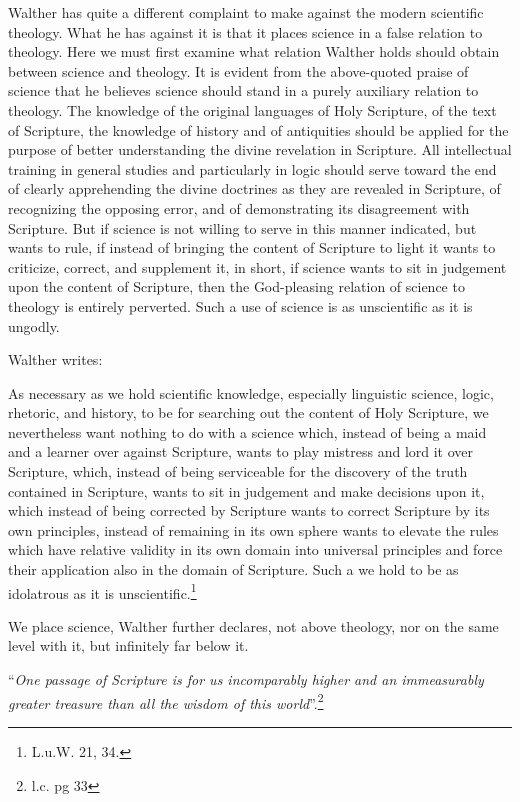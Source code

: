                Walther has quite a different complaint to make against the modern scientific theology.  What he has against it is that it places science in a false relation to theology.  Here we must first examine what relation Walther holds should obtain between science and theology.  It is evident from the above-quoted praise of science that he believes science should stand in a purely auxiliary relation to theology.  The knowledge of the original languages of Holy Scripture, of the text of Scripture, the knowledge of history and of antiquities should be applied for the purpose of better understanding the divine revelation in Scripture.  All intellectual training in general studies and particularly in logic should serve toward the end of clearly apprehending the divine doctrines as they are revealed in Scripture, of recognizing the opposing error, and of demonstrating its disagreement with Scripture.  But if science is not willing to serve in this manner indicated, but wants to rule, if instead of bringing the content of Scripture to light it wants to criticize, correct, and supplement it, in short, if science wants to sit in judgement upon the content of Scripture, then the God-pleasing relation of science to theology is entirely perverted.  Such a use of science is as unscientific as it is ungodly. \par Walther writes: \\\begin{fancyquotes} As necessary as we hold scientific knowledge, especially linguistic science, logic, rhetoric, and history, to be for searching out the content of Holy Scripture, we nevertheless want nothing to do with a science which, instead of being a maid and a learner over against Scripture, wants to play mistress and lord it over Scripture, which, instead of being serviceable for the discovery of the truth contained in Scripture, wants to sit in judgement and make decisions upon it, which instead of being corrected by Scripture wants to correct Scripture by its own principles, instead of remaining in its own sphere wants to elevate the rules which have relative validity in its own domain into universal principles and force their application also in the domain of Scripture.  Such a we hold to be as idolatrous as it is unscientific.\footnote{L.u.W. 21, 34.}\end{fancyquotes}  We place science, Walther further declares, not above theology, nor on the same level with it, but infinitely far below it. \begin{displayquote} “\textit{One passage of Scripture is for us incomparably higher and an immeasurably greater treasure than all the wisdom of this world}”.\footnote{l.c. pg 33}\end{displayquote}

